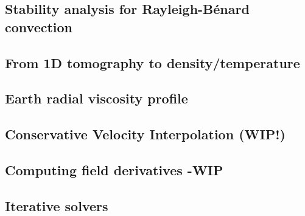 \documentclass[a4paper]{article}
\numberwithin{equation}{section}
\begin{document}
\subsection{Stability analysis for Rayleigh-B\'enard convection} \label{ss:sarb}  %
\newpage %
\subsection{From 1D tomography to density/temperature}  %
\newpage %
\subsection{Earth radial viscosity profile}  %
\newpage %
\subsection{Conservative Velocity Interpolation (WIP!)} \label{sec:cvi} %
\newpage %
\subsection{Computing field derivatives -WIP} \label{ss:nodderiv}  %
\newpage %
\subsection{Iterative solvers \label{ss:itsolvers}}  %
\newpage %






\newpage
\end{document}
